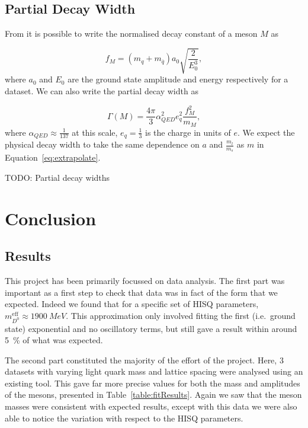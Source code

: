 \documentclass[a4paper,12pt]{article}
\begin{document}
\subsection{Partial Decay Width}
From \cite{chakraborty2017nonperturbative} it is possible to write the normalised decay constant of a meson $M$ as

\begin{equation}
    f_M = (m_q + m_{\overline{q}}) a_0 \sqrt{\frac{2}{E_0^3}}, 
\end{equation}
where $a_0$ and $E_0$ are the ground state amplitude and energy respectively for a dataset. We can also write the partial decay width as

\begin{equation}
    \Gamma(M) = \frac{4\pi}{3}\alpha_{QED}^2e_q^2 \frac{f_M^2}{m_M},
\end{equation}
where $\alpha_{QED}\approx \frac{1}{137}$ at this scale, $e_q=\frac{1}{3}$ is the charge in units of $e$. We expect the physical decay width to take the same dependence on $a$ and $\frac{m_l}{m_s}$ as $m$ in Equation~\ref{eq:extrapolate}.

TODO: Partial decay widths

\section{Conclusion}
\subsection{Results}
This project has been primarily focussed on data analysis. The first part was important as a first step to check that data was in fact of the form that we expected. Indeed we found that for a specific set of HISQ parameters, $m^\mathrm{eff}_{D^0}\approx \SI{1900}{MeV}$. This approximation only involved fitting the first (i.e.\ ground state) exponential and no oscillatory terms, but still gave a result within around \SI{5}{\%} of what was expected.

The second part constituted the majority of the effort of the project. Here, 3 datasets with varying light quark mass and lattice spacing were analysed using an existing tool. This gave far more precise values for both the mass and amplitudes of the mesons, presented in Table~\ref{table:fitResults}. Again we saw that the meson masses were consistent with expected results, except with this data we were also able to notice the variation with respect to the HISQ parameters.
\end{document}
